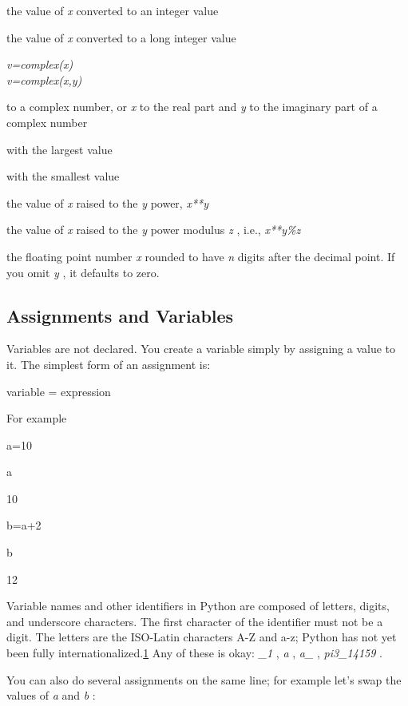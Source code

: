  the value of
\emph{x} converted to an integer value



 the value of
\emph{x} converted to a long integer value

 \emph{v=complex(x)\\
v=complex(x,y)}

 to a complex
number, or \emph{x} to the real part and \emph{y} to the imaginary part
of a complex number



 with
the largest value



 with
the smallest value



 the value of
\emph{x} raised to the \emph{y} power, \emph{x**y}



 the value of
\emph{x} raised to the \emph{y} power modulus \emph{z} , i.e.,
\emph{x**y\%z}



 the floating
point number \emph{x} rounded to have \emph{n} digits after the decimal
point. If you omit \emph{y} , it defaults to zero.

\subsection{Assignments and Variables}
\label{assignments-and-variables}

Variables are not declared. You
create a variable simply by assigning a value to it. The simplest form
of an assignment is:

variable = expression

For example


a=10


a

10


b=a+2


b

12

Variable names and other
identifiers in Python are composed of letters, digits, and underscore
characters. The first character of the identifier must not be a digit.
The letters are the ISO-Latin characters A-Z and a-z; Python has not yet
been fully internationalized.\protect\hyperlink{pgfId-115789}{1} Any of
these is okay: \emph{\_1} , \emph{a} , \emph{a\_} , \emph{pi3\_14159} .

You can also do several assignments
on the same line; for example let's swap the values of \emph{a} and
\emph{b} :



